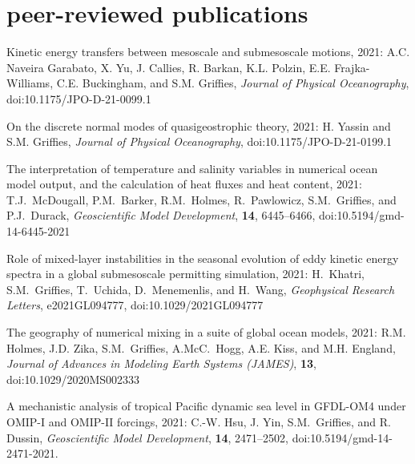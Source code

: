 \section*{\sc \color{Maroon} peer-reviewed publications}

\small 

\begin{etaremune}

\item Kinetic energy transfers between mesoscale and submesoscale motions, 2021: A.C. Naveira Garabato, X. Yu, J. Callies, R. Barkan, K.L. Polzin, E.E. Frajka-Williams, C.E. Buckingham, and S.M. Grif\/f\/ies, {\it Journal of Physical Oceanography}, doi:10.1175/JPO-D-21-0099.1

\item On the discrete normal modes of quasigeostrophic theory, 2021: H. Yassin and S.M. Grif\/f\/ies,  {\it Journal of Physical Oceanography}, doi:10.1175/JPO-D-21-0199.1

\item The interpretation of temperature and salinity variables in numerical ocean model output, and the calculation of heat fluxes and heat content, 2021: T.J.\ McDougall, P.M.\ Barker, R.M.\ Holmes, R.\ Pawlowicz, S.M.\ Grif\/f\/ies, and P.J.\ Durack, {\it Geoscientific Model Development}, {\bf 14}, 6445–6466, doi:10.5194/gmd-14-6445-2021




\item Role of mixed-layer instabilities in the seasonal evolution of eddy kinetic energy spectra in a global submesoscale permitting simulation, 2021: H.\ Khatri, S.M.\ Grif\/f\/ies, T.\ Uchida, D.\ Menemenlis, and H.\ Wang, {\it  Geophysical Research Letters}, e2021GL094777, doi:10.1029/2021GL094777

\item The geography of numerical mixing in a suite of global ocean models, 2021: R.M. Holmes, J.D. Zika, S.M.\ Grif\/f\/ies,  A.McC.\ Hogg, A.E. Kiss, and M.H. England, {\it Journal of Advances in Modeling Earth Systems (JAMES)}, {\bf 13},  \\ doi:10.1029/2020MS002333

\item A mechanistic analysis of tropical Pacific dynamic sea level in GFDL-OM4 under OMIP-I and OMIP-II forcings, 2021: C.-W. Hsu, J. Yin, S.M.\ Grif\/f\/ies, and R. Dussin, {\it Geoscientific Model Development}, {\bf 14}, 2471--2502, doi:10.5194/gmd-14-2471-2021.


\end{etaremune}
